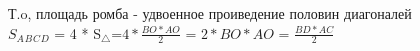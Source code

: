 \documentclass[preview]{standalone}
\begin{document}
\begin{center}
Т.o, площадь ромба - удвоенное проиведение половин диагоналей \\ $S_A$$_B$$_C$$_D$ = 4 * S$_\triangle$=$4 *$$\frac{BO * AO}{2}$ = $2* BO * AO$ = $\frac{BD * AC}{2}$
\end{center}
\end{document}
